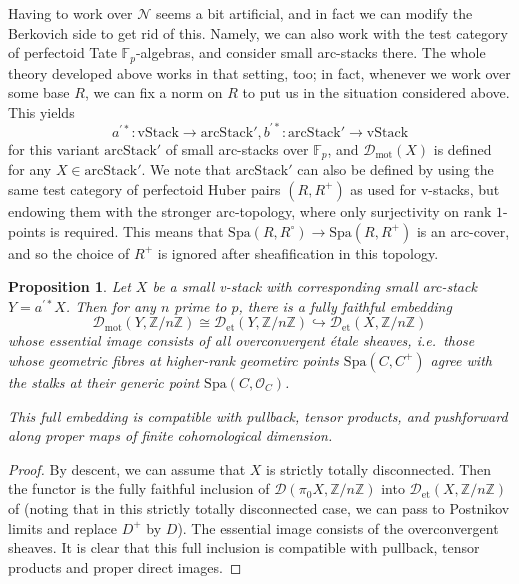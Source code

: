 \documentclass[11pt]{amsart}
\numberwithin{equation}{section}
\numberwithin{theorem}{section}
\newtheorem{proposition}[theorem]{Proposition}
\theoremstyle{definition}
\begin{document}
Having to work over $\mathcal N$ seems a bit artificial, and in fact we can modify the Berkovich side to get rid of this. Namely, we can also work with the test category of perfectoid Tate $\mathbb F_p$-algebras, and consider small arc-stacks there. The whole theory developed above works in that setting, too; in fact, whenever we work over some base $R$, we can fix a norm on $R$ to put us in the situation considered above. This yields
\[
a^{\prime\ast}: \mathrm{vStack}\to \mathrm{arcStack}', b^{\prime\ast}: \mathrm{arcStack}'\to \mathrm{vStack}
\]
for this variant $\mathrm{arcStack}'$ of small arc-stacks over $\mathbb F_p$, and $\mathcal D_{\mathrm{mot}}(X)$ is defined for any $X\in \mathrm{arcStack}'$. We note that $\mathrm{arcStack}'$ can also be defined by using the same test category of perfectoid Huber pairs $(R,R^+)$ as used for v-stacks, but endowing them with the stronger arc-topology, where only surjectivity on rank $1$-points is required. This means that $\mathrm{Spa}(R,R^\circ)\to \mathrm{Spa}(R,R^+)$ is an arc-cover, and so the choice of $R^+$ is ignored after sheafification in this topology.

\begin{proposition} Let $X$ be a small v-stack with corresponding small arc-stack $Y = a^{\prime\ast} X$. Then for any $n$ prime to $p$, there is a fully faithful embedding
\[
\mathcal D_{\mathrm{mot}}(Y,\mathbb Z/n\mathbb Z)\cong \mathcal D_{\mathrm{et}}(Y,\mathbb Z/n\mathbb Z)\hookrightarrow \mathcal D_{\mathrm{et}}(X,\mathbb Z/n\mathbb Z)
\]
whose essential image consists of all overconvergent \'etale sheaves, i.e.~those whose geometric fibres at higher-rank geometirc points $\mathrm{Spa}(C,C^+)$ agree with the stalks at their generic point $\mathrm{Spa}(C,\mathcal O_C)$.

This full embedding is compatible with pullback, tensor products, and pushforward along proper maps of finite cohomological dimension.
\end{proposition}

\begin{proof} By descent, we can assume that $X$ is strictly totally disconnected. Then the functor is the fully faithful inclusion of $\mathcal D(\pi_0 X,\mathbb Z/n\mathbb Z)$ into $\mathcal D_{\mathrm{et}}(X,\mathbb Z/n\mathbb Z)$ of \cite[Proposition 13.13, Proposition 22.7]{ECoD} (noting that in this strictly totally disconnected case, we can pass to Postnikov limits and replace $D^+$ by $D$). The essential image consists of the overconvergent sheaves. It is clear that this full inclusion is compatible with pullback, tensor products and proper direct images.
\end{proof}
\end{document}
